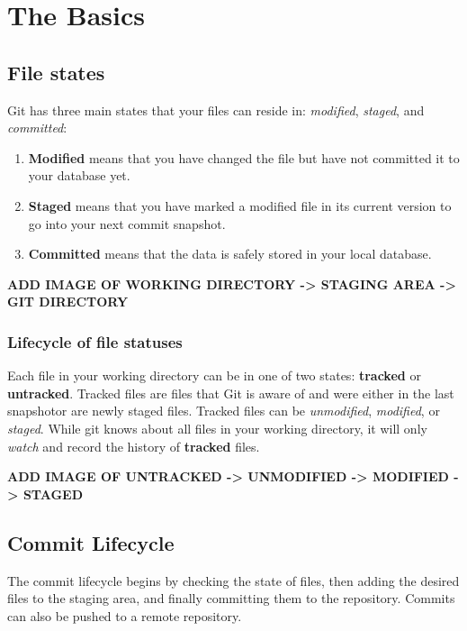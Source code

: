 \chapter{The Basics}
\chapteroverlay
\section{File states}
Git has three main states that your files can reside in: \textit{modified}, \textit{staged}, and \textit{committed}:
\begin{enumerate}
    \item \textbf{Modified} means that you have changed the file but have not committed it to your database yet.
    \item \textbf{Staged} means that you have marked a modified file in its current version to go into your next commit snapshot.
    \item \textbf{Committed} means that the data is safely stored in your local database.
\end{enumerate}

    \textbf{ADD IMAGE OF WORKING DIRECTORY -> STAGING AREA -> GIT DIRECTORY }\newline
    
\subsection{Lifecycle of file statuses}
Each file in your working directory can be in one of two states: \textbf{tracked} or \textbf{untracked}. Tracked files are files that Git is aware of and were either in the last snapshot\footnotemark or are newly staged files.
Tracked files can be \textit{unmodified}, \textit{modified}, or \textit{staged}. \newline
While git knows about all files in your working directory, it will only \textit{watch} and record the history of \textbf{tracked} files.

    \textbf{ADD IMAGE OF UNTRACKED -> UNMODIFIED -> MODIFIED -> STAGED}\newline

\section{Commit Lifecycle}
The commit lifecycle begins by checking the state of files, then adding the desired files to the staging area, and finally committing them to the repository. Commits can also be pushed to a remote repository.

